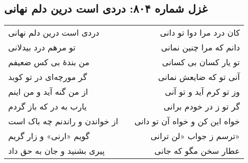 \begin{center}
\section*{غزل شماره ۸۰۴: دردی است درین دلم نهانی}
\label{sec:804}
\begin{longtable}{l p{0.5cm} r}
دردی است درین دلم نهانی
&&
کان درد مرا دوا تو دانی
\\
تو مرهم درد بیدلانی
&&
دانم که مرا چنین نمانی
\\
من بندهٔ بی کس ضعیفم
&&
تو یار کسان بی کسانی
\\
گر مورچه‌ای در تو کوبد
&&
آنی تو که ضایعش نمانی
\\
از من گنه آید و من اینم
&&
وز تو کرم آید و تو آنی
\\
یارب به در که باز گردم
&&
گر تو ز در خودم برانی
\\
از خواندن و راندنم چه باک است
&&
خواه این کن و خواه آن تو دانی
\\
گویم «ارنی» و زار گریم
&&
ترسم ز جواب «لن ترانی»
\\
پیری بشنید و جان به حق داد
&&
عطار سخن مگو که جانی
\\
\end{longtable}
\end{center}
